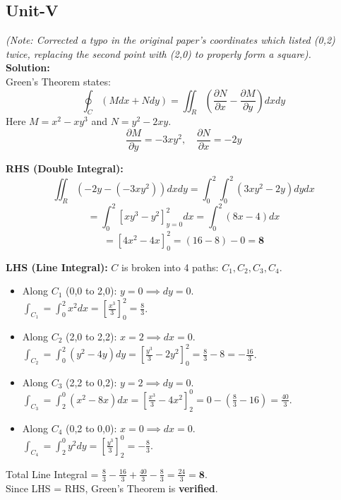 \documentclass[11pt,a4paper]{article}
\begin{document}
\subsection*{Unit-V}
\begin{tcolorbox}[colback=green!5!white,colframe=green!50!black,title=\textbf{10. Verify Green's theorem in plane for} $\oint(x^{2}-xy^{3})dx+(y^{2}-2xy)dy$ \textbf{where C is the square with (0, 0), (2, 0), (2, 2) and (0, 2).}]
\textit{(Note: Corrected a typo in the original paper's coordinates which listed (0,2) twice, replacing the second point with (2,0) to properly form a square).} \\
\textbf{Solution:} \\
Green's Theorem states:
$$\oint_C (Mdx + Ndy) = \iint_R \left(\frac{\partial N}{\partial x} - \frac{\partial M}{\partial y}\right) dx dy$$
Here $M = x^2-xy^3$ and $N = y^2-2xy$.
$$\frac{\partial M}{\partial y} = -3xy^2, \quad \frac{\partial N}{\partial x} = -2y$$

\textbf{RHS (Double Integral):}
$$\iint_R (-2y - (-3xy^2)) dx dy = \int_0^2 \int_0^2 (3xy^2 - 2y) dy dx$$
$$= \int_0^2 \left[ x y^3 - y^2 \right]_{y=0}^{2} dx = \int_0^2 (8x - 4) dx$$
$$= \left[ 4x^2 - 4x \right]_0^2 = (16 - 8) - 0 = \textbf{8}$$

\textbf{LHS (Line Integral):} $C$ is broken into 4 paths: $C_1, C_2, C_3, C_4$.
\begin{itemize}
    \item Along $C_1$ (0,0 to 2,0): $y=0 \implies dy=0$. \\
    $\int_{C_1} = \int_0^2 x^2 dx = \left[\frac{x^3}{3}\right]_0^2 = \frac{8}{3}$.
    \item Along $C_2$ (2,0 to 2,2): $x=2 \implies dx=0$. \\
    $\int_{C_2} = \int_0^2 (y^2 - 4y) dy = \left[\frac{y^3}{3} - 2y^2\right]_0^2 = \frac{8}{3} - 8 = -\frac{16}{3}$.
    \item Along $C_3$ (2,2 to 0,2): $y=2 \implies dy=0$. \\
    $\int_{C_3} = \int_2^0 (x^2 - 8x) dx = \left[\frac{x^3}{3} - 4x^2\right]_2^0 = 0 - (\frac{8}{3} - 16) = \frac{40}{3}$.
    \item Along $C_4$ (0,2 to 0,0): $x=0 \implies dx=0$. \\
    $\int_{C_4} = \int_2^0 y^2 dy = \left[\frac{y^3}{3}\right]_2^0 = -\frac{8}{3}$.
\end{itemize}
Total Line Integral = $\frac{8}{3} - \frac{16}{3} + \frac{40}{3} - \frac{8}{3} = \frac{24}{3} = \textbf{8}$. \\
Since LHS = RHS, Green's Theorem is \textbf{verified}.
\end{tcolorbox}
\end{document}
